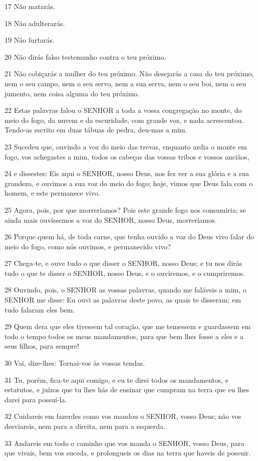 \par 17 Não matarás.
\par 18 Não adulterarás.
\par 19 Não furtarás.
\par 20 Não dirás falso testemunho contra o teu próximo.
\par 21 Não cobiçarás a mulher do teu próximo. Não desejarás a casa do teu próximo, nem o seu campo, nem o seu servo, nem a sua serva, nem o seu boi, nem o seu jumento, nem coisa alguma do teu próximo.
\par 22 Estas palavras falou o SENHOR a toda a vossa congregação no monte, do meio do fogo, da nuvem e da escuridade, com grande voz, e nada acrescentou. Tendo-as escrito em duas tábuas de pedra, deu-mas a mim.
\par 23 Sucedeu que, ouvindo a voz do meio das trevas, enquanto ardia o monte em fogo, vos achegastes a mim, todos os cabeças das vossas tribos e vossos anciãos,
\par 24 e dissestes: Eis aqui o SENHOR, nosso Deus, nos fez ver a sua glória e a sua grandeza, e ouvimos a sua voz do meio do fogo; hoje, vimos que Deus fala com o homem, e este permanece vivo.
\par 25 Agora, pois, por que morreríamos? Pois este grande fogo nos consumiria; se ainda mais ouvíssemos a voz do SENHOR, nosso Deus, morreríamos.
\par 26 Porque quem há, de toda carne, que tenha ouvido a voz do Deus vivo falar do meio do fogo, como nós ouvimos, e permanecido vivo?
\par 27 Chega-te, e ouve tudo o que disser o SENHOR, nosso Deus; e tu nos dirás tudo o que te disser o SENHOR, nosso Deus, e o ouviremos, e o cumpriremos.
\par 28 Ouvindo, pois, o SENHOR as vossas palavras, quando me faláveis a mim, o SENHOR me disse: Eu ouvi as palavras deste povo, as quais te disseram; em tudo falaram eles bem.
\par 29 Quem dera que eles tivessem tal coração, que me temessem e guardassem em todo o tempo todos os meus mandamentos, para que bem lhes fosse a eles e a seus filhos, para sempre!
\par 30 Vai, dize-lhes: Tornai-vos às vossas tendas.
\par 31 Tu, porém, fica-te aqui comigo, e eu te direi todos os mandamentos, e estatutos, e juízos que tu lhes hás de ensinar que cumpram na terra que eu lhes darei para possuí-la.
\par 32 Cuidareis em fazerdes como vos mandou o SENHOR, vosso Deus; não vos desviareis, nem para a direita, nem para a esquerda.
\par 33 Andareis em todo o caminho que vos manda o SENHOR, vosso Deus, para que vivais, bem vos suceda, e prolongueis os dias na terra que haveis de possuir.


